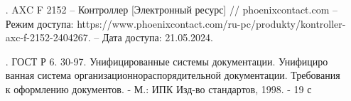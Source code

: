 {\begin{itemize}[leftmargin=2.15cm, labelwidth=0.65cm, labelsep=0.0cm]
    \item[\theimagecntr.]	AXC F 2152 {--} Контроллер [Электронный ресурс] // phoenixcontact.com – Режим доступа: https://www.phoenixcontact.com/ru-pc/produkty/kontroller-axc-f-2152-2404267. – Дата доступа: 21.05.2024. \addtocounter{imagecntr}{1}
    
    \item[\theimagecntr.] ГОСТ Р 6. 30-97. Унифицированные системы документации. Унифициро ванная система организационнораспорядительной документации. Требования к оформлению документов. - М.: ИПК Изд-во стандартов, 1998. - 19 с
    \addtocounter{imagecntr}{1}
    
     
    
    

\end{itemize}

}
